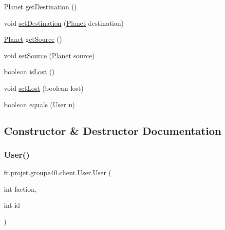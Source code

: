 \begin{DoxyCompactItemize}
\item 
\hyperlink{classfr_1_1projet_1_1groupe40_1_1model_1_1board_1_1_planet}{Planet} \hyperlink{classfr_1_1projet_1_1groupe40_1_1client_1_1_user_a9e98177d60b2cde17b9b41a37ba940ed}{get\+Destination} ()
\item 
void \hyperlink{classfr_1_1projet_1_1groupe40_1_1client_1_1_user_af7251a37f51a0044001bd67e421a6688}{set\+Destination} (\hyperlink{classfr_1_1projet_1_1groupe40_1_1model_1_1board_1_1_planet}{Planet} destination)
\item 
\hyperlink{classfr_1_1projet_1_1groupe40_1_1model_1_1board_1_1_planet}{Planet} \hyperlink{classfr_1_1projet_1_1groupe40_1_1client_1_1_user_a5f6ae24ee84e918ecd49638a9c1ca340}{get\+Source} ()
\item 
void \hyperlink{classfr_1_1projet_1_1groupe40_1_1client_1_1_user_a0ce1d1c1323e06ac29b2f8a129d90762}{set\+Source} (\hyperlink{classfr_1_1projet_1_1groupe40_1_1model_1_1board_1_1_planet}{Planet} source)
\item 
boolean \hyperlink{classfr_1_1projet_1_1groupe40_1_1client_1_1_user_a6df13bfed938d9847227a61b0d8a8d3c}{is\+Lost} ()
\item 
void \hyperlink{classfr_1_1projet_1_1groupe40_1_1client_1_1_user_a408635deee87b86bdfa10835ab90ad9d}{set\+Lost} (boolean lost)
\item 
boolean \hyperlink{classfr_1_1projet_1_1groupe40_1_1client_1_1_user_a33de252fa11ff7dd91275f4f5ff1266b}{equals} (\hyperlink{classfr_1_1projet_1_1groupe40_1_1client_1_1_user}{User} u)
\end{DoxyCompactItemize}


\subsection{Constructor \& Destructor Documentation}
\mbox{\label{classfr_1_1projet_1_1groupe40_1_1client_1_1_user_ad05b0747c066a5ee35cd9757c78b0e79}} 
\subsubsection{\texorpdfstring{User()}{User()}\hspace{0.1cm}{\footnotesize\ttfamily [1/3]}}
{\footnotesize\ttfamily fr.\+projet.\+groupe40.\+client.\+User.\+User (\begin{DoxyParamCaption}\item[{int}]{faction,  }\item[{int}]{id }\end{DoxyParamCaption})}

